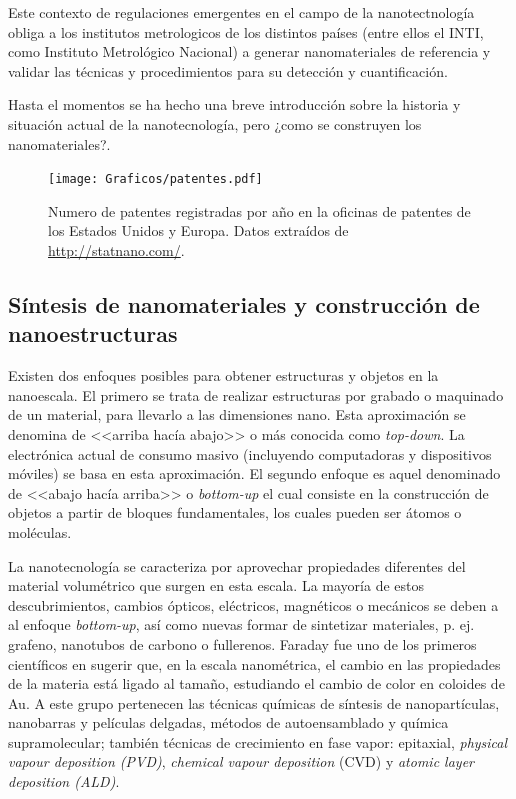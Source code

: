  	 Este contexto de regulaciones emergentes en el campo de la nanotectnología obliga a los institutos metrologicos de los distintos países (entre ellos el INTI, como Instituto Metrológico Nacional) a generar nanomateriales de referencia y validar las técnicas y procedimientos para su detección y cuantificación.

 	 Hasta el momentos se ha hecho una breve introducción sobre la historia y situación actual de la nanotecnología, pero ¿como se construyen los nanomateriales?.


		\begin{figure}[h!]
 			\begin{center}
 			\texttt{[image: Graficos/patentes.pdf]}
 			\vspace*{-0.3cm}
 			\caption[Número de patentes de productos en base nanotecnológica]{Numero de patentes registradas por año en la oficinas de patentes de los Estados Unidos y Europa. Datos extraídos de \url{http://statnano.com/}.}
 			\label{fig:patentes}
 		    \end{center}
 		    \end{figure}

 	\vspace*{-0.6cm}\subsection{Síntesis de nanomateriales y construcción de nanoestructuras}

		Existen dos enfoques posibles para obtener estructuras y objetos en la nanoescala. El primero se trata de realizar estructuras por grabado o maquinado de un material, para llevarlo a las dimensiones nano. Esta aproximación se denomina de <<arriba hacía abajo>> o más conocida como \textit{top-down}. La electrónica actual de consumo masivo (incluyendo computadoras y dispositivos móviles) se basa en esta aproximación. El segundo enfoque es aquel denominado de <<abajo hacía arriba>> o \textit{bottom-up} el cual consiste en la construcción de objetos a partir de bloques fundamentales, los cuales pueden ser átomos o moléculas. 

		La nanotecnología se caracteriza por aprovechar propiedades diferentes del material volumétrico que surgen en esta escala. La mayoría de estos descubrimientos, cambios ópticos, eléctricos, magnéticos o mecánicos se deben a al enfoque \textit{bottom-up}, así como nuevas formar de sintetizar materiales, p. ej. grafeno, nanotubos de carbono o fullerenos. Faraday fue uno de los primeros científicos en sugerir que, en la escala nanométrica, el cambio en las propiedades de la materia está ligado al tamaño, estudiando el cambio de color en coloides de Au\cite{faraday1857}. A este grupo pertenecen las técnicas químicas de síntesis de nanopartículas, nanobarras y películas delgadas, métodos de autoensamblado y química supramolecular; también técnicas de crecimiento en fase vapor: epitaxial, \textit{physical vapour deposition (PVD)}, \textit{chemical vapour deposition} (CVD) y \textit{atomic layer deposition (ALD)}.
			
